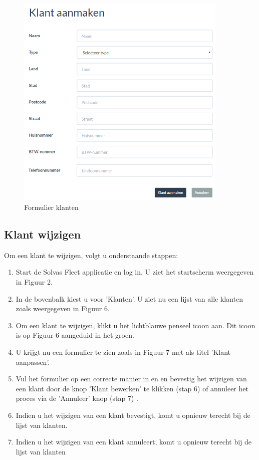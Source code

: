 \documentclass[11pt,openany]{article}
\begin{document}
\begin{figure}
	\centering
	\includegraphics[width=0.9\textwidth]{img/fig_g.png}
	\caption{Formulier klanten}
\end{figure}
\newpage
\subsection{Klant wijzigen}
Om een klant te wijzigen, volgt u onderstaande stappen:
\begin{enumerate}
	\item Start de Solvas Fleet applicatie en log in. U ziet het startscherm weergegeven in Figuur 2.
	\item In de bovenbalk kiest u voor 'Klanten'. U ziet nu een lijst van alle klanten zoals weergegeven in Figuur 6.
	\item Om een klant te wijzigen, klikt u het lichtblauwe penseel icoon aan. Dit icoon is op Figuur 6 aangeduid in het groen.
	\item U krijgt nu een formulier te zien zoals in Figuur 7 met als titel 'Klant aanpassen'.
	\item Vul het formulier op een correcte manier in en en bevestig het wijzigen van een klant door de knop 'Klant bewerken' te klikken (stap 6) of annuleer het proces via de 'Annuleer' knop (stap 7) .
	\item Indien u het wijzigen van een klant bevestigt, komt u opnieuw terecht bij de lijst van klanten.
	\item Indien u het wijzigen van een klant annuleert, komt u opnieuw terecht bij de lijst van klanten 
\end{enumerate}
\end{document}
